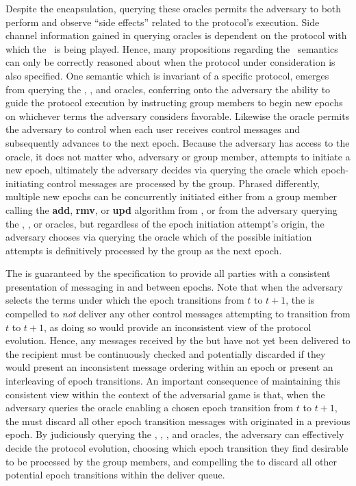 Despite the encapsulation, querying these oracles permits the adversary to both perform and observe ``side effects'' related to the protocol's execution.
Side channel information gained in querying oracles is dependent on the protocol with which the \CGKAsec\ is being played.
Hence, many propositions regarding the \CGKAsec\ semantics can only be correctly reasoned about when the protocol under consideration is also specified.
One semantic which is invariant of a specific protocol, emerges from querying the , , and  oracles, conferring onto the adversary the ability to guide the protocol execution by instructing group members to begin new epochs on whichever terms the adversary considers favorable.
Likewise the  oracle permits the adversary to control when each user receives control messages and subsequently advances to the next epoch.
Because the adversary has access to the  oracle, it does not matter who, adversary or group member, attempts to initiate a new epoch, ultimately the adversary decides via querying the  oracle which epoch-initiating control messages are processed by the group.
Phrased differently, multiple new epochs can be concurrently initiated either from a group member calling the \textbf{add}, \textbf{rmv}, or \textbf{upd} algorithm from \CGKAdef, or from the adversary querying the , , or  oracles, but regardless of the epoch initiation attempt's origin, the adversary chooses via querying the  oracle which of the possible initiation attempts is definitively processed by the group as the next epoch.

The  is guaranteed by the  specification to provide all parties with a consistent presentation of messaging in and between epochs.
Note that when the adversary selects the terms under which the epoch transitions from \(t\) to \(t+1\), the  is compelled to \emph{not} deliver any other control messages attempting to transition from \(t\) to \(t+1\), as doing so would provide an inconsistent view of the protocol evolution.
Hence, any messages received by the  but have not yet been delivered to the recipient must be continuously checked and potentially discarded if they would present an inconsistent message ordering within an epoch or present an interleaving of epoch transitions.
An important consequence of maintaining this consistent view within the context of the adversarial  game is that, when the adversary queries the  oracle enabling a chosen epoch transition from \(t\) to \(t+1\), the  must discard all other epoch transition messages with originated in a previous epoch.
By judiciously querying the , , , and  oracles, the adversary can effectively decide the protocol evolution, choosing which epoch transition they find desirable to be processed by the group members, and compelling the  to discard all other potential epoch transitions within the deliver queue.

